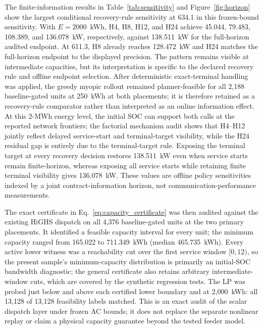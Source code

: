 \documentclass[11pt]{article}
\begin{document}
The finite-information results in Table~\ref{tab:sensitivity} and Figure~\ref{fig:horizon} show the largest conditional recovery-rule sensitivity at 634.1 in this frozen-bound sensitivity. With $E=2000$~kWh, H4, H8, H12, and H24 achieve 45.044, 79.483, 108.389, and 136.078~kW, respectively, against 138.511~kW for the full-horizon audited endpoint. At 611.3, H8 already reaches 128.472~kW and H24 matches the full-horizon endpoint to the displayed precision. The pattern remains visible at intermediate capacities, but its interpretation is specific to the declared recovery rule and offline endpoint selection. After deterministic exact-terminal handling was applied, the greedy myopic rollout remained planner-feasible for all 2,188 baseline-gated units at 250~kWh at both placements; it is therefore retained as a recovery-rule comparator rather than interpreted as an online information effect. At this 2-MWh energy level, the initial SOC can support both calls at the reported network frontiers; the factorial mechanism audit shows that H4--H12 jointly reflect delayed service-start and terminal-target visibility, while the H24 residual gap is entirely due to the terminal-target rule. Exposing the terminal target at every recovery decision restores 138.511~kW even when service starts remain finite-horizon, whereas exposing all service starts while retaining finite terminal visibility gives 136.078~kW. These values are offline policy sensitivities indexed by a joint contract-information horizon, not communication-performance measurements.

The exact certificate in Eq.~\eqref{eq:capacity_certificate} was then audited against the existing HiGHS dispatch on all 4,376 baseline-gated units at the two primary placements. It identified a feasible capacity interval for every unit; the minimum capacity ranged from 165.022 to 711.349~kWh (median 465.735~kWh). Every active lower witness was a reachability cut over the first service window $[0,12)$, so the present sample's minimum-capacity distribution is primarily an initial-SOC bandwidth diagnostic; the general certificate also retains arbitrary intermediate-window cuts, which are covered by the synthetic regression tests. The LP was probed just below and above each certified lower boundary and at 2,000~kWh: all 13,128 of 13,128 feasibility labels matched. This is an exact audit of the scalar dispatch layer under frozen AC bounds; it does not replace the separate nonlinear replay or claim a physical capacity guarantee beyond the tested feeder model.
\end{document}
